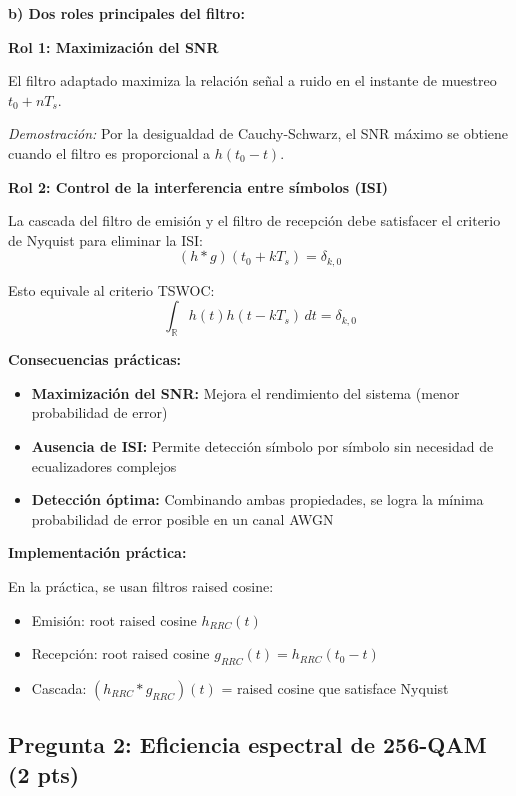 \documentclass[11pt,a4paper]{article}
\begin{document}
\textbf{b) Dos roles principales del filtro:}

\textbf{Rol 1: Maximizaci\'on del SNR}

El filtro adaptado maximiza la relaci\'on se\~nal a ruido en el instante de muestreo $t_0 + nT_s$.

\textit{Demostraci\'on:} Por la desigualdad de Cauchy-Schwarz, el SNR m\'aximo se obtiene cuando el filtro es proporcional a $h(t_0 - t)$.

\textbf{Rol 2: Control de la interferencia entre s\'imbolos (ISI)}

La cascada del filtro de emisi\'on y el filtro de recepci\'on debe satisfacer el criterio de Nyquist para eliminar la ISI:
\[
(h * g)(t_0 + kT_s) = \delta_{k,0}
\]

Esto equivale al criterio TSWOC:
\[
\int_{\mathbb{R}} h(t) h(t - kT_s)\, dt = \delta_{k,0}
\]

\textbf{Consecuencias pr\'acticas:}

\begin{itemize}
    \item \textbf{Maximizaci\'on del SNR:} Mejora el rendimiento del sistema (menor probabilidad de error)
    
    \item \textbf{Ausencia de ISI:} Permite detecci\'on s\'imbolo por s\'imbolo sin necesidad de ecualizadores complejos
    
    \item \textbf{Detecci\'on \'optima:} Combinando ambas propiedades, se logra la m\'inima probabilidad de error posible en un canal AWGN
\end{itemize}

\textbf{Implementaci\'on pr\'actica:}

En la pr\'actica, se usan filtros raised cosine:
\begin{itemize}
    \item Emisi\'on: root raised cosine $h_{RRC}(t)$
    \item Recepci\'on: root raised cosine $g_{RRC}(t) = h_{RRC}(t_0 - t)$
    \item Cascada: $(h_{RRC} * g_{RRC})(t)$ = raised cosine que satisface Nyquist
\end{itemize}



\subsection*{Pregunta 2: Eficiencia espectral de 256-QAM (2 pts)}
\end{document}
